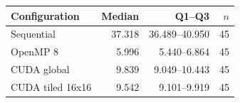 \begin{tabular}{lrrr}
\hline
Configuration & Median & Q1--Q3 & $n$ \\
\hline
Sequential & 37.318 & 36.489--40.950 & 45 \\
OpenMP 8 & 5.996 & 5.440--6.864 & 45 \\
CUDA global & 9.839 & 9.049--10.443 & 45 \\
CUDA tiled 16x16 & 9.542 & 9.101--9.919 & 45 \\
\hline
\end{tabular}